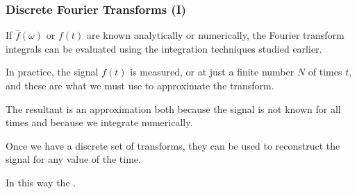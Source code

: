 \documentclass[hyperref={colorlinks=true}]{beamer}
\begin{document}
\begin{frame}%
  \frametitle{Discrete Fourier Transforms (I)}

  If $\hat{f}(\omega)$ or $f(t)$ are known analytically or numerically, the Fourier transform integrals can be evaluated using the integration techniques studied earlier. 
  
  \mysp \pause
  
  In practice, the signal $f(t)$  is measured, or  at just a finite number $N$ of times $t$, and these are what we must use to approximate the transform. 
  
  \mysp \pause
  
  The resultant  is an approximation both because the signal is not known for all times and because we integrate numerically.
  
  \mysp \pause
  
  Once we have a discrete set of transforms, they can be used to reconstruct the signal for any value of the time. 
  
  \mysp \pause
  
  In this way the .
  
\end{frame}

\end{document}
